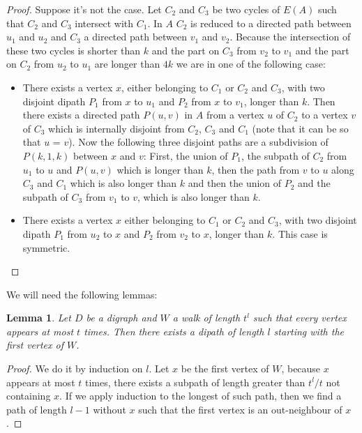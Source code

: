 \documentclass[10pt]{article}
\theoremstyle{plain}
\newtheorem{lemma}[theorem]{Lemma}
\theoremstyle{definition}
\theoremstyle{remark}
\begin{document}
\begin{proof}

Suppose it's not the case. Let $C_2$ and $C_3$ be two cycles of $E(A)$ such that $C_2$ and $C_3$ intersect with $C_1$. 
In $A$ $C_2$ is reduced to a directed path between $u_1$ and $u_2$ and $C_3$ a directed path between $v_1$ and $v_2$.
Because the intersection of these two cycles is shorter than $k$ and the part on $C_3$ from $v_2$ to $v_1$ and the part
on $C_2$ from $u_2$ to $u_1$ are longer than $4k$ we are in one of the following case:
\begin{itemize}
	\item There exists a vertex $x$, either belonging to $C_1$ or $C_2$ and $C_3$, with two disjoint dipath $P_1$ from
	$x$ to $u_1$ and $P_2$ from $x$ to $v_1$, longer than $k$. Then there exists a directed path $P(u,v)$ in $A$ from 
	a vertex $u$ of $C_2$ to a vertex $v$ of $C_3$ which is internally disjoint from  $C_2$, $C_3$ and $C_1$ 
	(note that it can be so that $u$ = $v$). Now the following three disjoint paths are a subdivision of $P(k,1,k)$ between $x$ and $v$:
	First, the union of $P_1$, the subpath of $C_2$ from $u_1$ to $u$ and $P(u,v)$ which is longer than $k$, then the path from $v$ to $u$ 
	along $C_3$ and $C_1$ which is also longer than $k$ and then the union of $P_2$ and the subpath of $C_3$ from $v_1$ to $v$, which is also longer than $k$.
	\item There exists a vertex $x$ either belonging to $C_1$ or $C_2$ and $C_3$, with two disjoint dipath $P_1$ from
	$u_2$ to $x$ and $P_2$ from $v_2$ to $x$, longer than $k$. This case is symmetric. 
\end{itemize}

\end{proof}


We will need the following lemmas: 

\begin{lemma}\label{walk}
Let $D$ be a digraph and $W$ a walk of length $t^l$ such that every vertex appears at most $t$ times.
Then there exists a dipath of length $l$ starting with the first vertex of $W$.
\end{lemma}

\begin{proof}
We do it by induction on $l$. Let $x$ be the first vertex of $W$, because $x$ appears at most $t$ times, there exists a subpath of length greater 
than $t^l/t$ not containing $x$. If we apply induction to the longest of such path, then we find a path of length $l-1$ without $x$ such that
 the first vertex is an out-neighbour of $x$.  

\end{proof}
\end{document}
